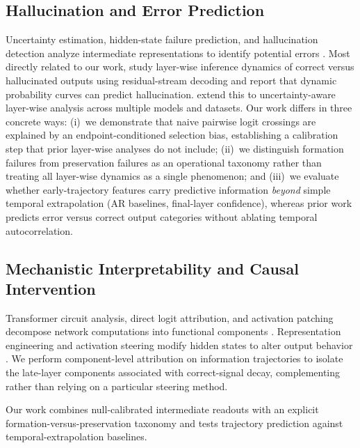 \documentclass{article} %
\begin{document}
\subsection{Hallucination and Error Prediction}
Uncertainty estimation, hidden-state failure prediction, and hallucination detection analyze intermediate representations to identify potential errors \citep{schuster2022confident, kuhn2023semantic, azaria2023internal, manakul2023selfcheckgpt}. Most directly related to our work, \citet{jiang2024hallucination} study layer-wise inference dynamics of correct versus hallucinated outputs using residual-stream decoding and report that dynamic probability curves can predict hallucination. \citet{kim2025uncertainty} extend this to uncertainty-aware layer-wise analysis across multiple models and datasets. Our work differs in three concrete ways: (i)~we demonstrate that naive pairwise logit crossings are explained by an endpoint-conditioned selection bias, establishing a calibration step that prior layer-wise analyses do not include; (ii)~we distinguish formation failures from preservation failures as an operational taxonomy rather than treating all layer-wise dynamics as a single phenomenon; and (iii)~we evaluate whether early-trajectory features carry predictive information \emph{beyond} simple temporal extrapolation (AR baselines, final-layer confidence), whereas prior work predicts error versus correct output categories without ablating temporal autocorrelation.

\subsection{Mechanistic Interpretability and Causal Intervention}
Transformer circuit analysis, direct logit attribution, and activation patching decompose network computations into functional components \citep{elhage2021mathematical, olsson2022incontext, wang2022interpretability, nanda2023progress}. Representation engineering and activation steering modify hidden states to alter output behavior \citep{turner2023activation, rimsky2023steering, zou2023representation}. We perform component-level attribution on information trajectories to isolate the late-layer components associated with correct-signal decay, complementing rather than relying on a particular steering method.

Our work combines null-calibrated intermediate readouts with an explicit formation-versus-preservation taxonomy and tests trajectory prediction against temporal-extrapolation baselines.
\end{document}

